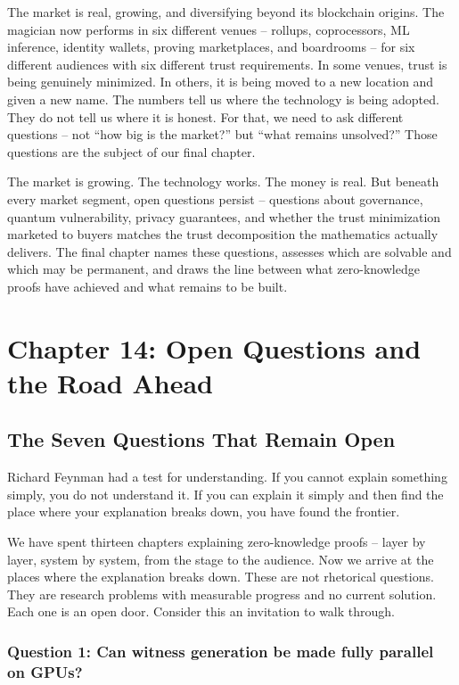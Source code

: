 \documentclass[
  11pt,
  openany]{report}
\begin{document}
The market is real, growing, and diversifying beyond its blockchain origins. The
magician now performs in six different venues -- rollups, coprocessors, ML
inference, identity wallets, proving marketplaces, and boardrooms -- for six
different audiences with six different trust requirements. In some venues, trust
is being genuinely minimized. In others, it is being moved to a new location and
given a new name. The numbers tell us where the technology is being adopted.
They do not tell us where it is honest. For that, we need to ask different
questions -- not ``how big is the market?'' but ``what remains unsolved?'' Those
questions are the subject of our final chapter.

The market is growing. The technology works. The money is real. But beneath
every market segment, open questions persist -- questions about governance,
quantum vulnerability, privacy guarantees, and whether the trust minimization
marketed to buyers matches the trust decomposition the mathematics actually
delivers. The final chapter names these questions, assesses which are solvable
and which may be permanent, and draws the line between what zero-knowledge
proofs have achieved and what remains to be built.

\chapter{Chapter 14: Open Questions and the Road
Ahead}\label{chapter-14-open-questions-and-the-road-ahead}

\section{The Seven Questions That Remain
Open}\label{the-seven-questions-that-remain-open}

Richard Feynman had a test for understanding. If you cannot explain something
simply, you do not understand it. If you can explain it simply and then find the
place where your explanation breaks down, you have found the frontier.

We have spent thirteen chapters explaining zero-knowledge proofs -- layer by
layer, system by system, from the stage to the audience. Now we arrive at the
places where the explanation breaks down. These are not rhetorical questions.
They are research problems with measurable progress and no current solution.
Each one is an open door. Consider this an invitation to walk through.

\subsection{Question 1: Can witness generation be made fully parallel on
GPUs?}\label{question-1-can-witness-generation-be-made-fully-parallel-on-gpus}
\end{document}
